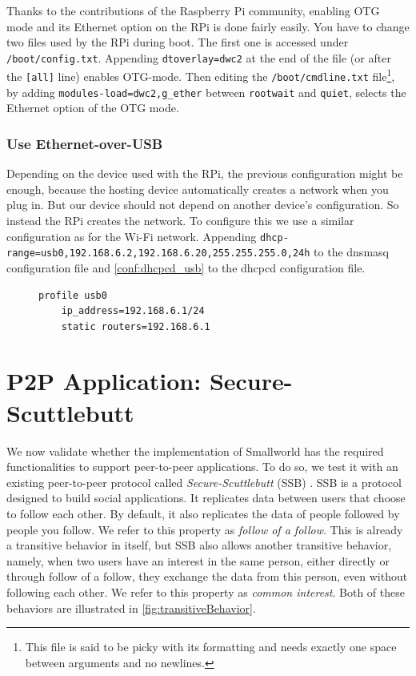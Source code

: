 \documentclass[a4paper,11pt,oneside]{report}
\begin{document}
Thanks to the contributions of the Raspberry Pi community, enabling OTG mode and its Ethernet option on the RPi is done fairly easily. You have to change two files used by the RPi during boot. The first one is accessed under \verb|/boot/config.txt|. Appending \verb|dtoverlay=dwc2| at the end of the file (or after the \verb|[all]| line) enables OTG-mode. Then editing the \verb|/boot/cmdline.txt| file\footnote{This file is said to be picky with its formatting and needs exactly one space between arguments and no newlines.}, by adding \verb|modules-load=dwc2,g_ether| between \verb|rootwait| and \verb|quiet|, selects the Ethernet option of the OTG mode.

\subsection{Use Ethernet-over-USB}

Depending on the device used with the RPi, the previous configuration might be enough, because the hosting device automatically creates a network when you plug in. But our device should not depend on another device's configuration. So instead the RPi creates the network. To configure this we use a similar configuration as for the Wi-Fi network. Appending \verb|dhcp-range=usb0,192.168.6.2,192.168.6.20,255.255.255.0,24h| to the dnsmasq configuration file and \autoref{conf:dhcpcd_usb} to the dhcpcd configuration file.

\begin{figure}
\begin{lstlisting}[label=conf:dhcpcd_usb, caption={DHCP client configuration, Ethernet-over-USB}]
    profile usb0
    ip_address=192.168.6.1/24
    static routers=192.168.6.1
\end{lstlisting}
\end{figure}

\chapter{P2P Application: Secure-Scuttlebutt}
\label{chap:ssb}

We now validate whether the implementation of Smallworld has the required functionalities to support peer-to-peer applications. To do so, we test it with an existing peer-to-peer protocol called \emph{Secure-Scuttlebutt} (SSB) \cite{tarr2019secure, kermarrec2020gossiping}. SSB is a protocol designed to build social applications. It replicates data between users that choose to follow each other. By default, it also replicates the data of people followed by people you follow. We refer to this property as \emph{follow of a follow}. This is already a transitive behavior in itself, but SSB also allows another transitive behavior, namely, when two users have an interest in the same person, either directly or through follow of a follow, they exchange the data from this person, even without following each other. We refer to this property as \emph{common interest}. Both of these behaviors are illustrated in \autoref{fig:transitiveBehavior}.
\end{document}
